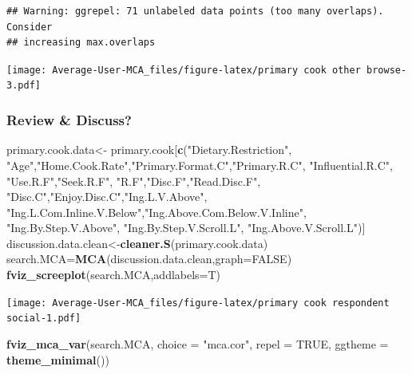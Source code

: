 \documentclass[
]{article}
\newenvironment{Shaded}{\begin{snugshade}}{\end{snugshade}}
\newcommand{\DataTypeTok}[1]{\textcolor[rgb]{0.13,0.29,0.53}{#1}}
\newcommand{\KeywordTok}[1]{\textcolor[rgb]{0.13,0.29,0.53}{\textbf{#1}}}
\newcommand{\NormalTok}[1]{#1}
\newcommand{\OtherTok}[1]{\textcolor[rgb]{0.56,0.35,0.01}{#1}}
\newcommand{\StringTok}[1]{\textcolor[rgb]{0.31,0.60,0.02}{#1}}
\begin{document}
\begin{verbatim}
## Warning: ggrepel: 71 unlabeled data points (too many overlaps). Consider
## increasing max.overlaps
\end{verbatim}

\texttt{[image: Average-User-MCA\_files/figure-latex/primary cook other browse-3.pdf]}

\hypertarget{review-discuss-3}{%
\subsubsection{Review \& Discuss?}\label{review-discuss-3}}

\begin{Shaded}
\begin{Highlighting}[]
\NormalTok{primary.cook.data<-}\StringTok{ }\NormalTok{primary.cook[}\KeywordTok{c}\NormalTok{(}\StringTok{"Dietary.Restriction"}\NormalTok{, }\StringTok{"Age"}\NormalTok{,}\StringTok{"Home.Cook.Rate"}\NormalTok{,}\StringTok{"Primary.Format.C"}\NormalTok{,}\StringTok{"Primary.R.C"}\NormalTok{, }
                                   \StringTok{"Influential.R.C"}\NormalTok{, }\StringTok{"Use.R.F"}\NormalTok{,}\StringTok{"Seek.R.F"}\NormalTok{, }\StringTok{"R.F"}\NormalTok{,}\StringTok{"Disc.F"}\NormalTok{,}\StringTok{"Read.Disc.F"}\NormalTok{,}
                                   \StringTok{"Disc.C"}\NormalTok{,}\StringTok{"Enjoy.Disc.C"}\NormalTok{,}\StringTok{"Ing.L.V.Above"}\NormalTok{,}
            \StringTok{"Ing.L.Com.Inline.V.Below"}\NormalTok{,}\StringTok{"Ing.Above.Com.Below.V.Inline"}\NormalTok{,  }\StringTok{"Ing.By.Step.V.Above"}\NormalTok{,  }\StringTok{"Ing.By.Step.V.Scroll.L"}\NormalTok{,}
            \StringTok{"Ing.Above.V.Scroll.L"}\NormalTok{)]}
\NormalTok{discussion.data.clean<-}\KeywordTok{cleaner.S}\NormalTok{(primary.cook.data)}
\NormalTok{search.MCA=}\KeywordTok{MCA}\NormalTok{(discussion.data.clean,}\DataTypeTok{graph=}\OtherTok{FALSE}\NormalTok{)}
\KeywordTok{fviz_screeplot}\NormalTok{(search.MCA,}\DataTypeTok{addlabels=}\NormalTok{T)}
\end{Highlighting}
\end{Shaded}

\texttt{[image: Average-User-MCA\_files/figure-latex/primary cook respondent social-1.pdf]}

\begin{Shaded}
\begin{Highlighting}[]
\KeywordTok{fviz_mca_var}\NormalTok{(search.MCA, }\DataTypeTok{choice =} \StringTok{"mca.cor"}\NormalTok{, }\DataTypeTok{repel =} \OtherTok{TRUE}\NormalTok{,}
             \DataTypeTok{ggtheme =} \KeywordTok{theme_minimal}\NormalTok{())}
\end{Highlighting}
\end{Shaded}
\end{document}
